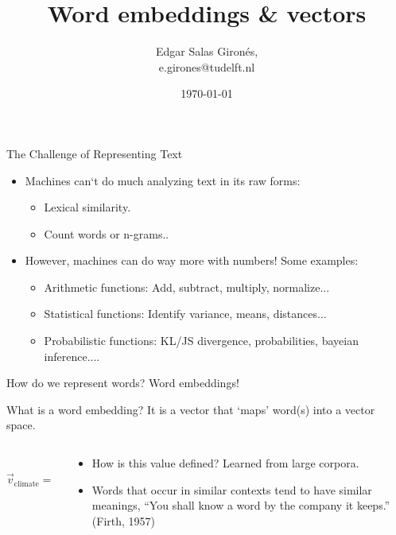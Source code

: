 \documentclass{beamer}
\title{Word embeddings \& vectors}
\author[E. Salas Gironés]{Edgar Salas Gironés, \\ e.girones@tudelft.nl}
\date{\today}
\begin{document}
\frame{\titlepage}

\begin{frame}{The Challenge of Representing Text}
    \begin{itemize}
        \item Machines can`t do much analyzing text in its raw forms:
        \begin{itemize}
            \item Lexical similarity.
            \item Count words or n-grams..
        \end{itemize} 
        \item However, machines can do way more with numbers! Some examples:
        \begin{itemize}
            \item Arithmetic functions: Add, subtract, multiply, normalize... 
            \item Statistical functions: Identify variance, means, distances...
            \item Probabilistic functions: KL/JS divergence, probabilities, bayeian inference....
        \end{itemize}
    \end{itemize}
\end{frame}

\begin{frame}{How do we represent words? Word embeddings!}

What is a word embedding? It is a vector that `maps' word(s) into a vector space.

    \begin{columns}
        \begin{column}{0.3\textwidth}
            \[
            \vec{v}_{\text{climate}} =
            \begin{bmatrix}
            0.12 \\
            -0.87 \\
            \vdots \\
            0.45
            \end{bmatrix}
            \]
        \end{column}

        \begin{column}{0.7\textwidth}
            \begin{itemize}
                \item How is this value defined? Learned from large corpora.
                \item Words that occur in similar contexts tend to have similar meanings, “You shall know a word by the company it keeps.” (Firth, 1957)
            \end{itemize}
        \end{column}
    \end{columns}

\end{frame}
\end{document}
